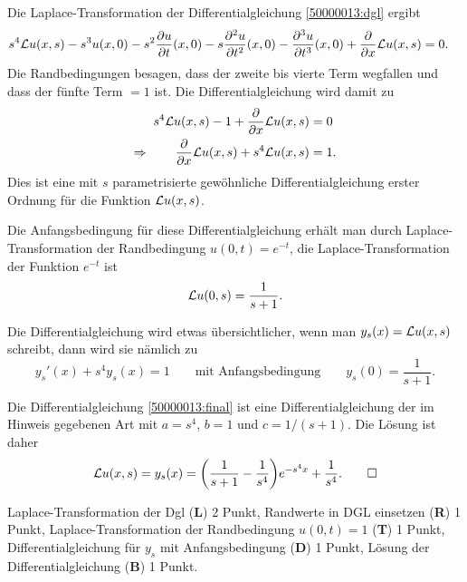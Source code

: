 \begin{loesung}
\begin{teilaufgaben}
\item
Die Laplace-Transformation der Differentialgleichung \eqref{50000013:dgl}
ergibt
\begin{align*}
s^4 {\cal L}u(x,s)
-s^3 u(x,0)
-s^2\frac{\partial u}{\partial t}(x,0)
-s\frac{\partial^2 u}{\partial t^2}(x,0)
-\frac{\partial^3 u}{\partial t^3}(x,0)
+
\frac{\partial}{\partial x}{\cal L}u(x,s)
&=
0.
\end{align*}
Die Randbedingungen besagen, dass der zweite bis vierte Term wegfallen
und dass der fünfte Term $=1$ ist.
Die Differentialgleichung wird damit zu
\begin{align*}
s^4 {\cal L}u(x,s)
-1
+
\frac{\partial}{\partial x}{\cal L}u(x,s)
&=
0
\\
\Rightarrow\qquad
\frac{\partial}{\partial x}{\cal L}u(x,s)
+
s^4 {\cal L}u(x,s)
&=
1.
\end{align*}
Dies ist eine mit $s$ parametrisierte gewöhnliche Differentialgleichung
erster Ordnung für die Funktion ${\cal L}u(x,s)$.

Die Anfangsbedingung für diese Differentialgleichung erhält man durch
Laplace-Transformation der Randbedingung $u(0,t)=e^{-t}$,
die Laplace-Transformation der Funktion $e^{-t}$ ist
\[
{\cal L}u(0,s) = \frac1{s+1}.
\]

Die Differentialgleichung wird etwas übersichtlicher, wenn man
$y_s(x) = {\cal L}u(x,s)$ schreibt, dann wird sie nämlich zu
\begin{equation}
y_s'(x) + s^4 y_s(x)=1
\qquad\text{mit Anfangsbedingung}\qquad
y_s(0)=\frac1{s+1}.
\label{50000013:final}
\end{equation}

\item
Die Differentialgleichung \eqref{50000013:final} ist eine Differentialgleichung
der im Hinweis gegebenen Art mit $a=s^4$, $b=1$ und $c=1/(s+1)$.
Die Lösung ist daher
\[
{\cal L}u(x,s)
=
y_s(x)
=
\biggl(\frac1{s+1}-\frac1{s^4}\biggr)e^{-s^4x} + \frac{1}{s^4}.
\qedhere
\]
\end{teilaufgaben}
\end{loesung}

\begin{bewertung}
Laplace-Transformation der Dgl ({\bf L}) 2 Punkt,
Randwerte in DGL einsetzen ({\bf R}) 1 Punkt,
Laplace-Transformation der Randbedingung $u(0,t)=1$ ({\bf T}) 1 Punkt,
Differentialgleichung für $y_s$ mit Anfangsbedingung ({\bf D}) 1 Punkt,
Lösung der Differentialgleichung ({\bf B}) 1 Punkt.
\end{bewertung}
